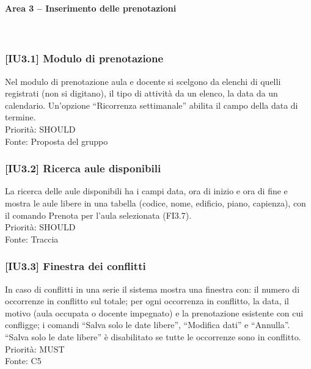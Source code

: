 \paragraph{Area 3 – Inserimento delle prenotazioni}~\\
\subsubsection{[IU3.1] Modulo di prenotazione}
Nel modulo di prenotazione aula e docente si scelgono da elenchi di quelli registrati (non si digitano), il tipo di attività da un elenco, la data da un calendario. Un'opzione ``Ricorrenza settimanale'' abilita il campo della data di termine.\\
Priorità: SHOULD\\Fonte: Proposta del gruppo

\subsubsection{[IU3.2] Ricerca aule disponibili}
La ricerca delle aule disponibili ha i campi data, ora di inizio e ora di fine e mostra le aule libere in una tabella (codice, nome, edificio, piano, capienza), con il comando Prenota per l'aula selezionata (FI3.7).\\
Priorità: SHOULD\\Fonte: Traccia

\subsubsection{[IU3.3] Finestra dei conflitti}
In caso di conflitti in una serie il sistema mostra una finestra con: il numero di occorrenze in conflitto sul totale; per ogni occorrenza in conflitto, la data, il motivo (aula occupata o docente impegnato) e la prenotazione esistente con cui confligge; i comandi ``Salva solo le date libere'', ``Modifica dati'' e ``Annulla''. ``Salva solo le date libere'' è disabilitato se tutte le occorrenze sono in conflitto.\\
Priorità: MUST\\Fonte: C5
